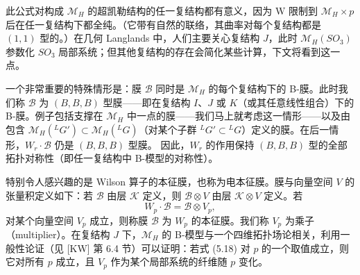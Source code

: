 
此公式对构成 $\mathcal{M}_H$ 的超凯勒结构的任一复结构都有意义，因为 $\mathrm{W}$ 限制到 $\mathcal{M}_H\times p$ 后在任一复结构下都全纯。（它带有自然的联络，其曲率对每个复结构都是 $(1,1)$ 型的。）在几何 Langlands 中，人们主要关心复结构 $J$，此时 $\mathcal{M}_H(SO_3)$ 参数化 $SO_3$ 局部系统；但其他复结构的存在会简化某些计算，下文将看到这一点。

一个非常重要的特殊情形是：膜 $\mathcal{B}$ 同时是 $\mathcal{M}_H$ 的每个复结构下的 B-膜。此时我们称 $\mathcal{B}$ 为 $(B,B,B)$ 型膜——即在复结构 $I$、$J$ 或 $K$（或其任意线性组合）下的 B-膜。例子包括支撑在 $\mathcal{M}_H$ 中一点的膜——我们马上就考虑这一情形——以及由包含 $\mathcal{M}_H({}^{L}G')\subset\mathcal{M}_H({}^{L}G)$（对某个子群 ${}^{L}G'\subset{}^{L}G$）定义的膜。在后一情形，$W_r\cdot\mathcal{B}$ 仍是 $(B,B,B)$ 型膜。
因此，$W_r$ 的作用保持 $(B,B,B)$ 型的全部拓扑对称性（即任一复结构中 B-模型的对称性）。


特别令人感兴趣的是 Wilson 算子的本征膜，也称为电本征膜。膜与向量空间 $V$ 的张量积定义如下：若 $\mathcal{B}$ 由层 $\mathcal{K}$ 定义，则 $\mathcal{B}\otimes V$ 由层 $\mathcal{K}\otimes V$ 定义。若
\begin{equation}\tag{5.18}
W_p\cdot\mathcal{B}=\mathcal{B}\otimes V_p,
\end{equation}
对某个向量空间 $V_p$ 成立，则称膜 $\mathcal{B}$ 为 $W_p$ 的本征膜。我们称 $V_p$ 为乘子（multiplier）。在复结构 $J$ 下，$\mathcal{M}_H$ 的 B-模型与一个四维拓扑场论相关，利用一般性论证（见 [KW] 第 6.4 节）可以证明：若式 (5.18) 对 $p$ 的一个取值成立，则它对所有 $p$ 成立，且 $V_p$ 作为某个局部系统的纤维随 $p$ 变化。

